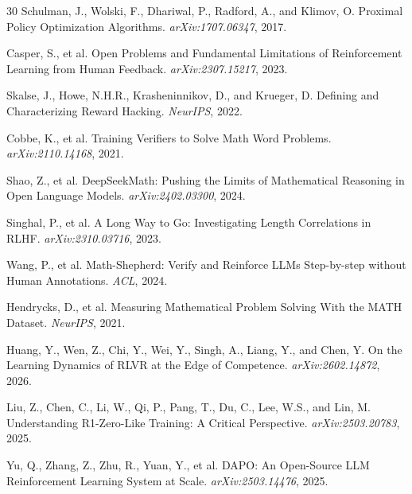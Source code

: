 \documentclass[11pt]{article}
\begin{document}
\begin{thebibliography}{30}
Schulman, J., Wolski, F., Dhariwal, P., Radford, A., and Klimov, O.
\newblock Proximal Policy Optimization Algorithms.
\newblock \emph{arXiv:1707.06347}, 2017.

Casper, S., et al.
\newblock Open Problems and Fundamental Limitations of Reinforcement Learning from Human Feedback.
\newblock \emph{arXiv:2307.15217}, 2023.

Skalse, J., Howe, N.H.R., Krasheninnikov, D., and Krueger, D.
\newblock Defining and Characterizing Reward Hacking.
\newblock \emph{NeurIPS}, 2022.

Cobbe, K., et al.
\newblock Training Verifiers to Solve Math Word Problems.
\newblock \emph{arXiv:2110.14168}, 2021.

Shao, Z., et al.
\newblock DeepSeekMath: Pushing the Limits of Mathematical Reasoning in Open Language Models.
\newblock \emph{arXiv:2402.03300}, 2024.

Singhal, P., et al.
\newblock A Long Way to Go: Investigating Length Correlations in RLHF.
\newblock \emph{arXiv:2310.03716}, 2023.

Wang, P., et al.
\newblock Math-Shepherd: Verify and Reinforce LLMs Step-by-step without Human Annotations.
\newblock \emph{ACL}, 2024.

Hendrycks, D., et al.
\newblock Measuring Mathematical Problem Solving With the MATH Dataset.
\newblock \emph{NeurIPS}, 2021.

Huang, Y., Wen, Z., Chi, Y., Wei, Y., Singh, A., Liang, Y., and Chen, Y.
\newblock On the Learning Dynamics of RLVR at the Edge of Competence.
\newblock \emph{arXiv:2602.14872}, 2026.

Liu, Z., Chen, C., Li, W., Qi, P., Pang, T., Du, C., Lee, W.S., and Lin, M.
\newblock Understanding R1-Zero-Like Training: A Critical Perspective.
\newblock \emph{arXiv:2503.20783}, 2025.

Yu, Q., Zhang, Z., Zhu, R., Yuan, Y., et al.
\newblock DAPO: An Open-Source LLM Reinforcement Learning System at Scale.
\newblock \emph{arXiv:2503.14476}, 2025.


\end{thebibliography}
\end{document}
